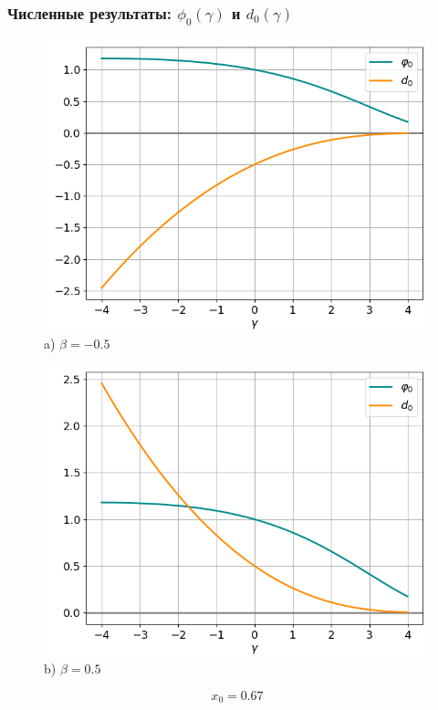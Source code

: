 \documentclass[fullscreen=true, unicode, bookmarks=false]{beamer}
\begin{document}
\begin{frame}
\frametitle{ Численные результаты: $ \phi_0(\gamma) $ и $ d_0(\gamma) $ }

\begin{figure} 
\begin{minipage}[h]{0.49\linewidth}
\begin{center}
\includegraphics[scale=0.38]{divergent_phi0d0_x0=0,67,beta=-0,5.png} \\ {\scriptsize a) $ \beta = -0.5 $}
\end{center}
\end{minipage} 
\hfill
\begin{minipage}[h]{0.49\linewidth}
\begin{center}
\includegraphics[scale=0.38]{divergent_phi0d0_x0=0,67,beta=0,5.png}  \\ {\scriptsize b) $ \beta = 0.5 $}
\end{center}
\end{minipage} 
\end{figure}

$$ x_0 = 0.67 $$

\end{frame}
\end{document}
